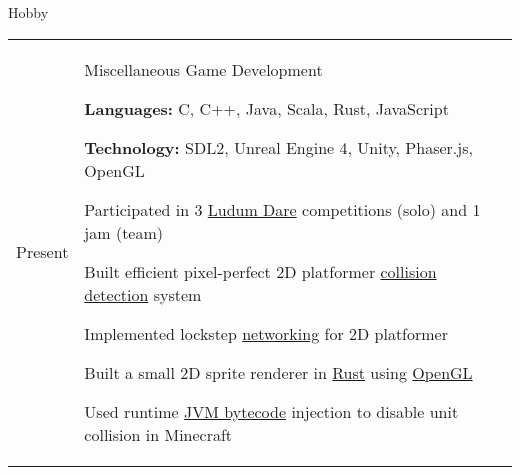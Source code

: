 \documentclass[12pt]{article}
\renewcommand{\section}[1]{{\Huge{#1}}\vspace{2 mm}}
\newenvironment{timeline}
        {\begin{tabular}{p{21 mm}|p{150 mm}}}
        {\end{tabular}}
\newenvironment{timelinetitle}
        {\vspace{-2 mm}\begin{large}}
        {\end{large}\vspace{-1.5 mm}}
\newcommand{\timespan}[2]{{#2}\newline{#1}}
\newcommand{\resumeitem}{\newline\vspace{3 mm}\hspace{3 mm}}
\newcommand{\resumestart}{\vspace{1 mm}}
\begin{document}
\vspace{3.0 mm}
\section{Hobby}
\hline

\begin{timeline}
\timespan{2011}{Present}
&
\begin{timelinetitle}
    Miscellaneous Game Development
\end{timelinetitle}
\resumestart

\resumeitem \textbf{Languages:} C, C++, Java, Scala, Rust, JavaScript

\resumeitem \textbf{Technology:} SDL2, Unreal Engine 4, Unity, Phaser.js, OpenGL

\resumeitem Participated in 3 \underline{Ludum Dare} competitions (solo) and 1 jam (team)

\resumeitem Built efficient pixel-perfect 2D platformer \underline{collision detection} system

\resumeitem Implemented lockstep \underline{networking} for 2D platformer

\resumeitem Built a small 2D sprite renderer in \underline{Rust} using \underline{OpenGL}

\resumeitem Used runtime \underline{JVM bytecode} injection to disable unit collision in Minecraft

\end{timeline}
\end{document}
